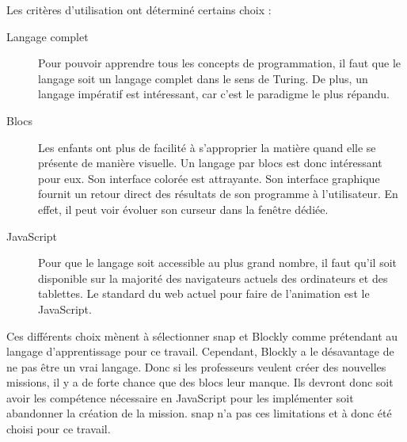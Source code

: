 Les critères d'utilisation ont déterminé certains choix :
\begin{description}
  \item[Langage complet] Pour pouvoir apprendre tous les concepts de programmation, il faut que le langage soit un langage complet dans le sens de Turing.  De plus, un langage impératif est intéressant, car c'est le paradigme le plus répandu.
  \item[Blocs] Les enfants ont plus de facilité à s'approprier la matière quand elle se présente de manière visuelle. %
  Un langage par \glspl{bloc} est donc intéressant pour eux. Son interface colorée est attrayante. Son interface graphique fournit un retour direct des résultats de son programme à l'utilisateur. En effet, il peut voir évoluer son curseur dans la fenêtre dédiée.
  \item[JavaScript] Pour que le langage soit accessible au plus grand nombre, il faut qu'il soit disponible sur la majorité des navigateurs actuels des ordinateurs et des tablettes. Le standard du web actuel pour faire de l'animation est le JavaScript.
\end{description}
Ces différents choix mènent à sélectionner \gls{snap} et Blockly comme prétendant au langage d'apprentissage pour ce travail. Cependant, Blockly a le désavantage de ne pas être un vrai langage. Donc si les professeurs veulent créer des nouvelles missions, il y a de forte chance que des blocs leur manque. Ils devront donc soit avoir les compétence nécessaire en JavaScript pour les implémenter soit abandonner la création de la mission. \gls{snap} n'a pas ces limitations et à donc été choisi pour ce travail.
